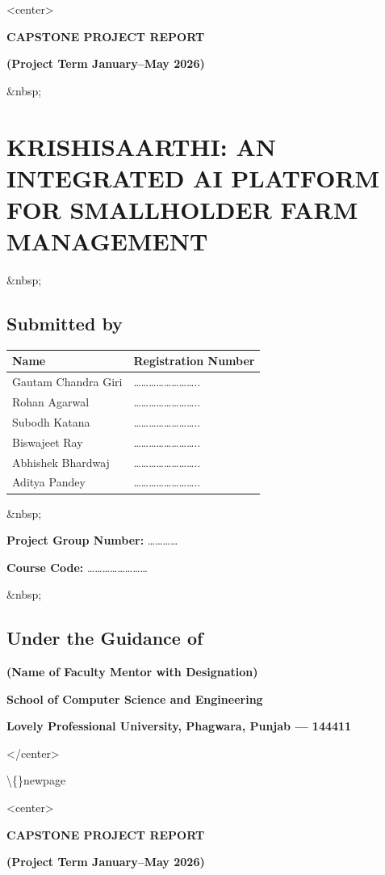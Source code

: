 \documentclass[12pt, a4paper]{report}
\begin{document}
<center>

\begin{center}
{\fontsize{14}{17}\bfseries CAPSTONE PROJECT REPORT}\\
\end{center}
\textbf{(Project Term January--May 2026)}

\&nbsp;

\section{KRISHISAARTHI: AN INTEGRATED AI PLATFORM FOR SMALLHOLDER FARM MANAGEMENT}
\&nbsp;

\subsection{Submitted by}
\begin{table}[htbp]
\centering
\small
\begin{tabularx}{\textwidth}{|X|X|}
\hline
Name & Registration Number \\
\hline
Gautam Chandra Giri & …………………….. \\
Rohan Agarwal & …………………….. \\
Subodh Katana & …………………….. \\
Biswajeet Ray & …………………….. \\
Abhishek Bhardwaj & …………………….. \\
Aditya Pandey & …………………….. \\
\hline
\end{tabularx}
\end{table}

\&nbsp;

\textbf{Project Group Number:} …………

\textbf{Course Code:} ……………………

\&nbsp;

\subsection{Under the Guidance of}
\textbf{(Name of Faculty Mentor with Designation)}

\textbf{School of Computer Science and Engineering}

\textbf{Lovely Professional University, Phagwara, Punjab --- 144411}

</center>

\textbackslash\{\}newpage

<center>

\begin{center}
{\fontsize{14}{17}\bfseries CAPSTONE PROJECT REPORT}\\
\end{center}
\textbf{(Project Term January--May 2026)}
\end{document}
